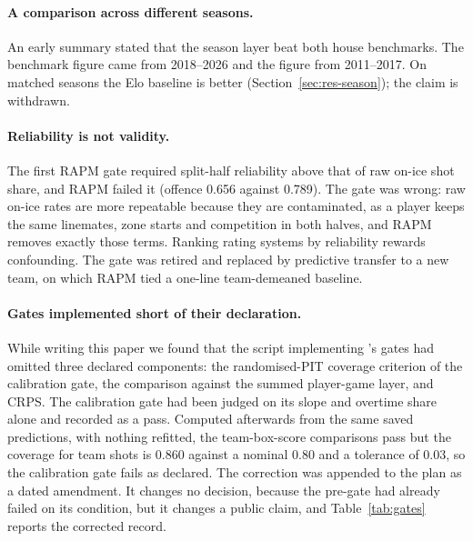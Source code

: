 \paragraph{A comparison across different seasons.}
An early summary stated that the season layer beat both house benchmarks. The
benchmark figure came from 2018--2026 and the \neurhl{} figure from 2011--2017.
On matched seasons the Elo baseline is better (Section~\ref{sec:res-season});
the claim is withdrawn.

\paragraph{Reliability is not validity.}
The first RAPM gate required split-half reliability above that of raw on-ice
shot share, and RAPM failed it (offence 0.656 against 0.789). The gate was
wrong: raw on-ice rates are more repeatable because they are contaminated, as
a player keeps the same linemates, zone starts and competition in both halves,
and RAPM removes exactly those terms. Ranking rating systems by reliability
rewards confounding. The gate was retired and replaced by predictive transfer
to a new team, on which RAPM tied a one-line team-demeaned baseline.

\paragraph{Gates implemented short of their declaration.}
While writing this paper we found that the script implementing \neurhlG{}'s gates
had omitted three declared components: the randomised-PIT coverage criterion
of the calibration gate, the comparison against the summed player-game layer,
and CRPS. The calibration gate had been judged on its slope and overtime share
alone and recorded as a pass. Computed afterwards from the same saved
predictions, with nothing refitted, the team-box-score comparisons pass but the
coverage for team shots is 0.860 against a nominal 0.80 and a tolerance of 0.03,
so the calibration gate fails as declared. The correction was appended to the
plan as a dated amendment. It changes no decision, because the pre-gate had
already failed on its \neurhlH{} condition, but it changes a public claim, and
Table~\ref{tab:gates} reports the corrected record.
